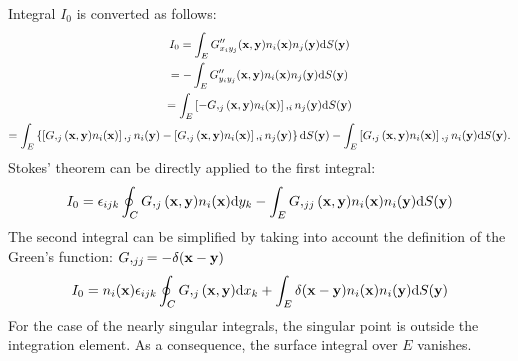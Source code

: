 Integral $I_0$ is converted as follows:
%
\begin{multline}
	I_0
	= \int_E G''_{x_i y_j}({\bf x}, {\bf y}) n_i({\bf x}) n_j({\bf y}) \mathrm{d} S({\bf y}) \\
	= -\int_E G''_{y_i y_j}({\bf x}, {\bf y}) n_i({\bf x}) n_j({\bf y}) \mathrm{d} S({\bf y}) \\
	= \int_E \left[ -G,_j({\bf x}, {\bf y}) n_i({\bf x}) \right],_{i} n_j({\bf y}) \mathrm{d} S({\bf y}) \\
	= \int_E \left\{
		\left[G,_j({\bf x}, {\bf y}) n_i({\bf x}) \right],_{j} n_i({\bf y})
		-\left[G,_j({\bf x}, {\bf y}) n_i({\bf x}) \right],_{i} n_j({\bf y})
	\right\} \mathrm{d} S({\bf y})
	- \int_E \left[G,_j({\bf x}, {\bf y}) n_i({\bf x}) \right],_{j} n_i({\bf y}) \mathrm{d} S({\bf y}).
\end{multline}
%
Stokes' theorem can be directly applied to the first integral:
%
\begin{equation}
	I_0 = \epsilon_{ijk} \oint_C G,_j({\bf x}, {\bf y}) n_i({\bf x}) \mathrm{d} y_k
	- \int_E G,_{jj}({\bf x}, {\bf y}) n_i({\bf x}) n_i({\bf y}) \mathrm{d} S({\bf y})
\end{equation}
%
The second integral can be simplified by taking into account the definition of the Green's function: $G,_{jj} = -\delta({\bf x} - {\bf y})$
%
\begin{equation}
	I_0 = n_i({\bf x}) \epsilon_{ijk} \oint_C G,_j({\bf x}, {\bf y}) \mathrm{d} x_k
	+ \int_E \delta({\bf x} - {\bf y}) n_i({\bf x}) n_i({\bf y}) \mathrm{d} S({\bf y})
\end{equation}
%
For the case of the nearly singular integrals, the singular point is outside the integration element. As a consequence, the surface integral over $E$ vanishes.

